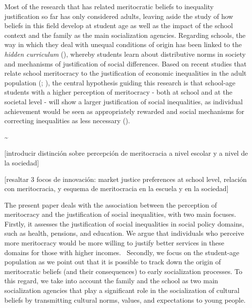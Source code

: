 \documentclass[
  letterpaper,
  DIV=11,
  numbers=noendperiod]{scrartcl}
\begin{document}
Most of the research that has related meritocratic beliefs to inequality
justification so far has only considered adults, leaving aside the study
of how beliefs in this field develop at student age as well as the
impact of the school context and the family as the main socialization
agencies. Regarding schools, the way in which they deal with unequal
conditions of origin has been linked to the \emph{hidden curriculum}
(), whereby students
learn about distributive norms in society and mechanisms of
justification of social differences. Based on recent studies that relate
school meritocracy to the justification of economic inequalities in the
adult population (; ),
the central hypothesis guiding this research is that school-age students
with a higher perception of meritocracy - both at school and at the
societal level - will show a larger justification of social
inequalities, as individual achievement would be seen as appropriately
rewarded and social mechanisms for correcting inequalities as less
necessary ().

\textasciitilde{}

{[}introducir distinción sobre percepción de meritocracia a nivel
escolar y a nivel de la sociedad{]}

{[}resaltar 3 focos de innovación: market justice preferences at school
level, relación con meritocracia, y esquema de meritocracia en la
escuela y en la sociedad{]}

The present paper deals with the association between the perception of
meritocracy and the justification of social inequalities, with two main
focuses. Firstly, it assesses the justification of social inequalities
in social policy domains, such as health, pensions, and education. We
argue that individuals who perceive more meritocracy would be more
willing to justify better services in these domains for those with
higher incomes.~ Secondly, we focus on the student-age population as we
point out that it is possible to track down the origin of meritocratic
beliefs (and their consequences) to early socialization processes. To
this regard, we take into account the family and the school as two main
socialization agencies that play a significant role in the socialization
of cultural beliefs by transmitting cultural norms, values, and
expectations to young people.~
\end{document}
